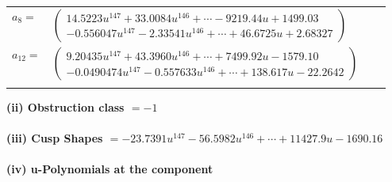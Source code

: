 \documentclass[1p]{elsarticle_modified}
\theoremstyle{definition}
\begin{document}
\begin{tabular}{m{7pt} m{180pt} m{7pt} m{180pt} }
\flushright $a_{8}=$&$\begin{pmatrix}14.5223 u^{147}+33.0084 u^{146}+\cdots-9219.44 u+1499.03\\-0.556047 u^{147}-2.33541 u^{146}+\cdots+46.6725 u+2.68327\end{pmatrix}$ \\
\flushright $a_{12}=$&$\begin{pmatrix}9.20435 u^{147}+43.3960 u^{146}+\cdots+7499.92 u-1579.10\\-0.0490474 u^{147}-0.557633 u^{146}+\cdots+138.617 u-22.2642\end{pmatrix}$\\&\end{tabular}
\flushleft \textbf{(ii) Obstruction class $= -1$}\\~\\
\flushleft \textbf{(iii) Cusp Shapes $= -23.7391 u^{147}-56.5982 u^{146}+\cdots+11427.9 u-1690.16$}\\~\\
\newpage\renewcommand{\arraystretch}{1}
\flushleft \textbf{(iv) u-Polynomials at the component}\newline \\
\end{document}
